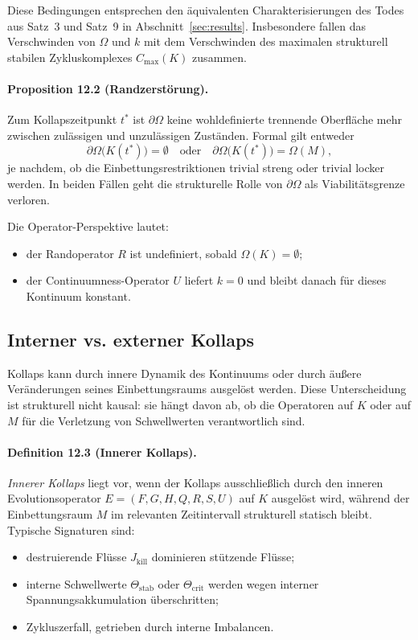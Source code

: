 Diese Bedingungen entsprechen den äquivalenten Charakterisierungen des Todes aus
Satz~3 und Satz~9 in Abschnitt~\ref{sec:results}. Insbesondere fallen das
Verschwinden von \(\Omega\) und \(k\) mit dem Verschwinden des maximalen
strukturell stabilen Zykluskomplexes \(C_{\max}(K)\) zusammen.

\paragraph{Proposition 12.2 (Randzerstörung).}
Zum Kollapszeitpunkt \(t^{\ast}\) ist \(\partial\Omega\) keine wohldefinierte
trennende Oberfläche mehr zwischen zulässigen und unzulässigen Zuständen.
Formal gilt entweder
\begin{equation}
  \partial\Omega\big(K(t^{\ast})\big) = \emptyset
  \quad\text{oder}\quad
  \partial\Omega\big(K(t^{\ast})\big) = \Omega(M),
\end{equation}
je nachdem, ob die Einbettungsrestriktionen trivial streng oder trivial locker
werden. In beiden Fällen geht die strukturelle Rolle von \(\partial\Omega\)
als Viabilitätsgrenze verloren.

Die Operator-Perspektive lautet:
\begin{itemize}
  \item der Randoperator \(R\) ist undefiniert, sobald \(\Omega(K)=\emptyset\);
  \item der Continuumness-Operator \(U\) liefert \(k=0\) und bleibt danach für
        dieses Kontinuum konstant.
\end{itemize}

\subsection{Interner vs. externer Kollaps}

Kollaps kann durch innere Dynamik des Kontinuums oder durch äußere Veränderungen
seines Einbettungsraums ausgelöst werden. Diese Unterscheidung ist strukturell
nicht kausal: sie hängt davon ab, ob die Operatoren auf \(K\) oder auf \(M\) für
die Verletzung von Schwellwerten verantwortlich sind.

\paragraph{Definition 12.3 (Innerer Kollaps).}
\emph{Innerer Kollaps} liegt vor, wenn der Kollaps ausschließlich durch den
inneren Evolutionsoperator \(E=(F,G,H,Q,R,S,U)\) auf \(K\) ausgelöst wird,
während der Einbettungsraum \(M\) im relevanten Zeitintervall strukturell
statisch bleibt. Typische Signaturen sind:
\begin{itemize}
  \item destruierende Flüsse \(J_{\mathrm{kill}}\) dominieren stützende Flüsse;
  \item interne Schwellwerte \(\Theta_{\mathrm{stab}}\) oder
        \(\Theta_{\mathrm{crit}}\) werden wegen interner Spannungsakkumulation
        überschritten;
  \item Zykluszerfall, getrieben durch interne Imbalancen.
\end{itemize}

